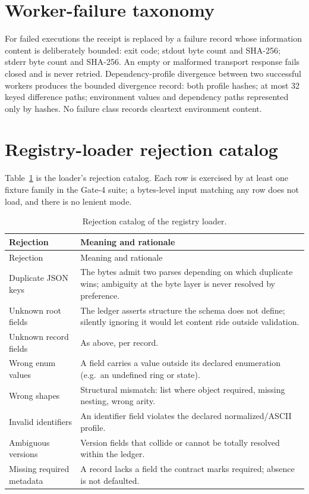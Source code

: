 \section{Worker-failure taxonomy}\label{tables:failures}

For failed executions the receipt is replaced by a failure record whose information content is deliberately bounded: exit code; stdout byte count and SHA-256; stderr byte count and SHA-256. An empty or malformed transport response fails closed and is never retried. Dependency-profile divergence between two successful workers produces the bounded divergence record: both profile hashes; at most 32 keyed difference paths; environment values and dependency paths represented only by hashes. No failure class records cleartext environment content.

\section{Registry-loader rejection catalog}\label{tables:loader}

Table~\ref{tables:tab:loader} is the loader's rejection catalog. Each row is exercised by at least one fixture family in the Gate-4 suite; a bytes-level input matching any row does not load, and there is no lenient mode.

\begin{longtable}{@{}p{}p{}@{}}
\caption{Rejection catalog of the registry loader.}\label{tables:tab:loader}\\
\toprule
Rejection & Meaning and rationale \\
\midrule
\endfirsthead
\toprule
Rejection & Meaning and rationale \\
\midrule
\endhead
\bottomrule
\endfoot
Duplicate JSON keys & The bytes admit two parses depending on which duplicate wins; ambiguity at the byte layer is never resolved by preference. \\
\addlinespace
Unknown root fields & The ledger asserts structure the schema does not define; silently ignoring it would let content ride outside validation. \\
\addlinespace
Unknown record fields & As above, per record. \\
\addlinespace
Wrong enum values & A field carries a value outside its declared enumeration (e.g.\ an undefined ring or state). \\
\addlinespace
Wrong shapes & Structural mismatch: list where object required, missing nesting, wrong arity. \\
\addlinespace
Invalid identifiers & An identifier field violates the declared normalized/ASCII profile. \\
\addlinespace
Ambiguous versions & Version fields that collide or cannot be totally resolved within the ledger. \\
\addlinespace
Missing required metadata & A record lacks a field the contract marks required; absence is not defaulted. \\
\end{longtable}

